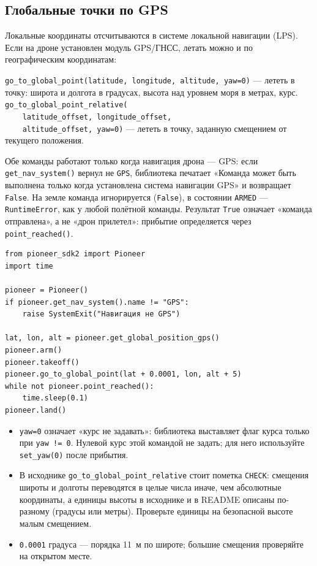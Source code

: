 \subsection{Глобальные точки по GPS}

Локальные координаты отсчитываются в системе локальной навигации (LPS). Если на дроне установлен модуль GPS/ГНСС, летать можно и по географическим координатам:

\begin{codebox}
\verb|go_to_global_point(latitude, longitude, altitude, yaw=0)| --- лететь в точку: широта и долгота в градусах, высота над уровнем моря в метрах, курс.\\
\verb|go_to_global_point_relative(|\\
\verb|    latitude_offset, longitude_offset,|\\
\verb|    altitude_offset, yaw=0)| --- лететь в точку, заданную смещением от текущего положения.
\end{codebox}

Обе команды работают только когда навигация дрона --- GPS: если \verb|get_nav_system()| вернул не \verb|GPS|, библиотека печатает «Команда может быть выполнена только когда установлена система навигации GPS» и возвращает \verb|False|. На земле команда игнорируется (\verb|False|), в состоянии \verb|ARMED| --- \verb|RuntimeError|, как у любой полётной команды. Результат \verb|True| означает «команда отправлена», а не «дрон прилетел»: прибытие определяется через \verb|point_reached()|.

\begin{codebox}
\small
\begin{verbatim}
from pioneer_sdk2 import Pioneer
import time

pioneer = Pioneer()
if pioneer.get_nav_system().name != "GPS":
    raise SystemExit("Навигация не GPS")

lat, lon, alt = pioneer.get_global_position_gps()
pioneer.arm()
pioneer.takeoff()
pioneer.go_to_global_point(lat + 0.0001, lon, alt + 5)
while not pioneer.point_reached():
    time.sleep(0.1)
pioneer.land()
\end{verbatim}
\end{codebox}

\begin{warnbox}
\begin{itemize}
    \item \verb|yaw=0| означает «курс не задавать»: библиотека выставляет флаг курса только при \verb|yaw != 0|. Нулевой курс этой командой не задать; для него используйте \verb|set_yaw(0)| после прибытия.
    \item В исходнике \verb|go_to_global_point_relative| стоит пометка \texttt{CHECK}: смещения широты и долготы переводятся в целые числа иначе, чем абсолютные координаты, а единицы высоты в исходнике и в README описаны по-разному (градусы или метры). Проверьте единицы на безопасной высоте малым смещением.
    \item \verb|0.0001| градуса --- порядка 11~м по широте; большие смещения проверяйте на открытом месте.
\end{itemize}
\end{warnbox}

